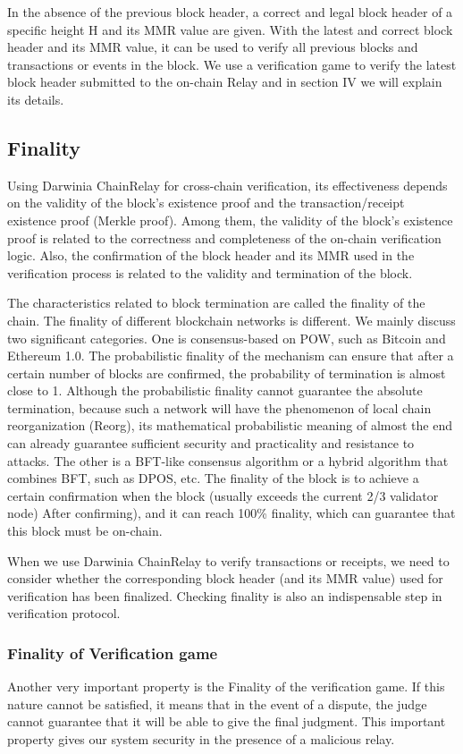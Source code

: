 In the absence of the previous block header, a correct and legal block header of a specific height H and its MMR value are given. With the latest and correct block header and its MMR value, it can be used to verify all previous blocks and transactions or events in the block. We use a verification game to verify the latest block header submitted to the on-chain Relay and in section IV we will explain its details.

\subsection*{Finality}
Using Darwinia ChainRelay for cross-chain verification, its effectiveness depends on the validity of the block’s existence proof and the transaction/receipt existence proof (Merkle proof). Among them, the validity of the block’s existence proof is related to the correctness and completeness of the on-chain verification logic. Also, the confirmation of the block header and its MMR used in the verification process is related to the validity and termination of the block.

The characteristics related to block termination are called the finality of the chain. The finality of different blockchain networks is different. We mainly discuss two significant categories. One is consensus-based on POW, such as Bitcoin and Ethereum 1.0. The probabilistic finality of the mechanism can ensure that after a certain number of blocks are confirmed, the probability of termination is almost close to 1. Although the probabilistic finality cannot guarantee the absolute termination, because such a network will have the phenomenon of local chain reorganization (Reorg), its mathematical probabilistic meaning of almost the end can already guarantee sufficient security and practicality and resistance to attacks. The other is a BFT-like consensus algorithm or a hybrid algorithm that combines BFT, such as DPOS, etc. The finality of the block is to achieve a certain confirmation when the block (usually exceeds the current 2/3 validator node) After confirming), and it can reach 100\% finality, which can guarantee that this block must be on-chain.

When we use Darwinia ChainRelay to verify transactions or receipts, we need to consider whether the corresponding block header (and its MMR value) used for verification has been finalized. Checking finality is also an indispensable step in verification protocol.

\subsubsection*{Finality of Verification game}

Another very important property is the Finality of the verification game. If this nature cannot be satisfied, it means that in the event of a dispute, the judge cannot guarantee that it will be able to give the final judgment. This important property gives our system security in the presence of a malicious relay.
